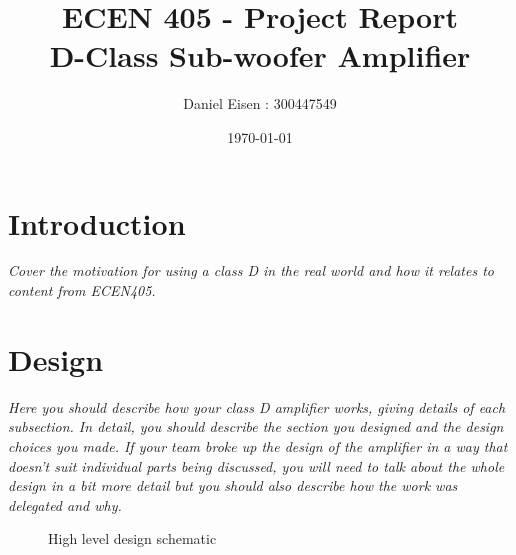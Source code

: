 \documentclass[11pt]{article}
\title{ECEN 405 - Project Report \\ D-Class Sub-woofer Amplifier}
\author{Daniel Eisen : 300447549}
\date{\today}
\begin{document}
\maketitle

\section{Introduction}
 
\textit{Cover the motivation for using a class D in the real world and how it relates to content from ECEN405.}

\newpage
\section{Design}
 
\textit{Here you should describe how your class D amplifier works, giving details of each subsection.
In detail, you should describe the section you designed and the design choices you made. If your team broke up the design of the amplifier in a way that doesn’t suit individual parts being discussed, you will need to talk about the whole design in a bit more detail but you should also describe how the work was delegated and why.}
 
\begin{figure}[h!]
  \centering
  \caption{High level design schematic}
\end{figure}
\end{document}
